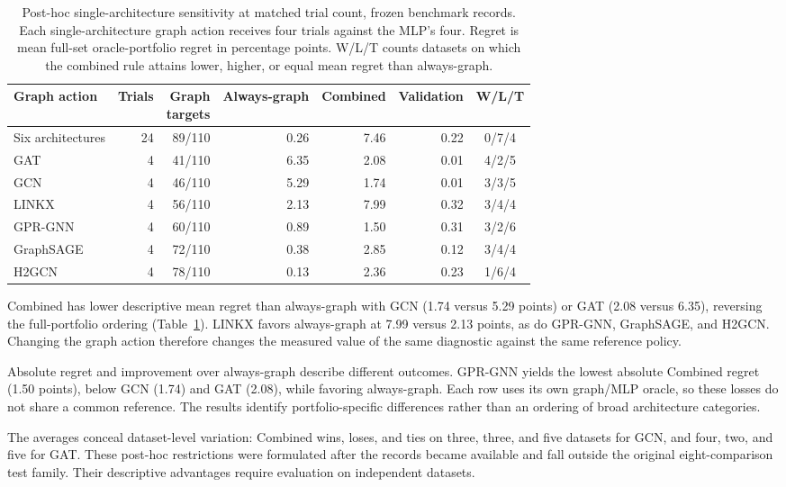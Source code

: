 \begin{table}[t]
\centering
\caption{Post-hoc single-architecture sensitivity at matched trial count, frozen benchmark records. Each single-architecture graph action receives four trials against the MLP's four. Regret is mean full-set oracle-portfolio regret in percentage points. W/L/T counts datasets on which the combined rule attains lower, higher, or equal mean regret than always-graph.}
\label{tab:equal_budget}
\small
\setlength{\tabcolsep}{3.5pt}
\begin{tabular}{@{}lrrrrrc@{}}
\toprule
Graph action & Trials & \shortstack{Graph\\targets} & Always-graph & Combined & Validation & W/L/T \\
\midrule
Six architectures & 24 & 89/110 & 0.26 & 7.46 & 0.22 & 0/7/4 \\
\midrule
GAT & 4 & 41/110 & 6.35 & 2.08 & 0.01 & 4/2/5 \\
GCN & 4 & 46/110 & 5.29 & 1.74 & 0.01 & 3/3/5 \\
LINKX & 4 & 56/110 & 2.13 & 7.99 & 0.32 & 3/4/4 \\
GPR-GNN & 4 & 60/110 & 0.89 & 1.50 & 0.31 & 3/2/6 \\
GraphSAGE & 4 & 72/110 & 0.38 & 2.85 & 0.12 & 3/4/4 \\
H2GCN & 4 & 78/110 & 0.13 & 2.36 & 0.23 & 1/6/4 \\
\bottomrule
\end{tabular}
\end{table}


Combined has lower descriptive mean regret than always-graph with GCN (1.74 versus 5.29 points) or GAT (2.08 versus 6.35), reversing the full-portfolio ordering (Table~\ref{tab:equal_budget}). LINKX favors always-graph at 7.99 versus 2.13 points, as do GPR-GNN, GraphSAGE, and H2GCN. Changing the graph action therefore changes the measured value of the same diagnostic against the same reference policy.

Absolute regret and improvement over always-graph describe different outcomes. GPR-GNN yields the lowest absolute Combined regret (1.50 points), below GCN (1.74) and GAT (2.08), while favoring always-graph. Each row uses its own graph/MLP oracle, so these losses do not share a common reference. The results identify portfolio-specific differences rather than an ordering of broad architecture categories.

The averages conceal dataset-level variation: Combined wins, loses, and ties on three, three, and five datasets for GCN, and four, two, and five for GAT. These post-hoc restrictions were formulated after the records became available and fall outside the original eight-comparison test family. Their descriptive advantages require evaluation on independent datasets.

